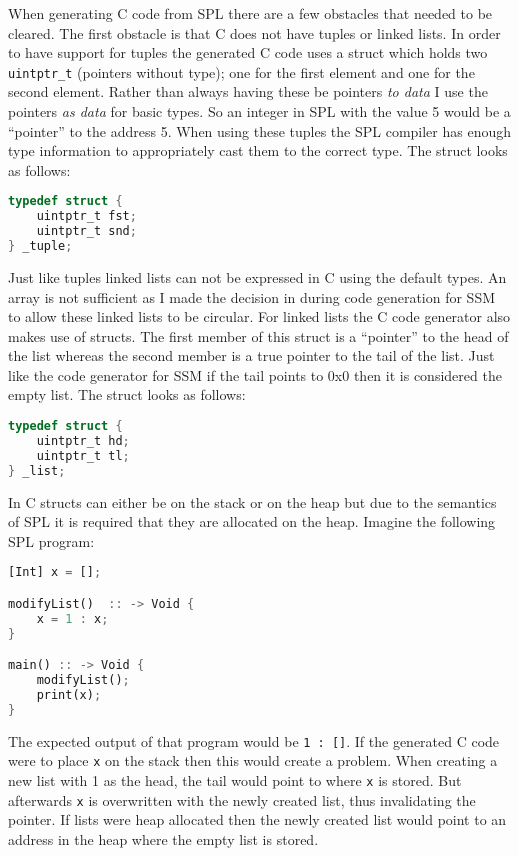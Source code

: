 \documentclass{article}
\begin{document}
When generating C code from SPL there are a few obstacles that needed to be cleared. The first obstacle is that C does not have tuples or linked lists. In order to have support for tuples the generated C code uses a struct which holds two \texttt{uintptr\_t} (pointers without type); one for the first element and one for the second element. Rather than always having these be pointers \textit{to data} I use the pointers \textit{as data} for basic types. So an integer in SPL with the value 5 would be a ``pointer'' to the address 5. When using these tuples the SPL compiler has enough type information to appropriately cast them to the correct type. The struct looks as follows:
\begin{lstlisting}[language=C, style=boxed]
typedef struct {
	uintptr_t fst;
	uintptr_t snd;
} _tuple;
\end{lstlisting}

Just like tuples linked lists can not be expressed in C using the default types. An array is not sufficient as I made the decision in during code generation for SSM to allow these linked lists to be circular. For linked lists the C code generator also makes use of structs. The first member of this struct is a ``pointer'' to the head of the list whereas the second member is a true pointer to the tail of the list. Just like the code generator for SSM if the tail points to 0x0 then it is considered the empty list. The struct looks as follows:
\begin{lstlisting}[language=C, style=boxed]
typedef struct {
	uintptr_t hd;
	uintptr_t tl;
} _list;
\end{lstlisting}

In C structs can either be on the stack or on the heap but due to the semantics of SPL it is required that they are allocated on the heap. Imagine the following SPL program:
\begin{lstlisting}[language=Rust, style=boxed]
[Int] x = [];

modifyList()  :: -> Void {
	x = 1 : x;
}

main() :: -> Void {
	modifyList();
	print(x);
}
\end{lstlisting}

The expected output of that program would be \texttt{1 : []}. If the generated C code were to place \texttt{x} on the stack then this would create a problem. When creating a new list with 1 as the head, the tail would point to where \texttt{x} is stored. But afterwards \texttt{x} is overwritten with the newly created list, thus invalidating the pointer. If lists were heap allocated then the newly created list would point to an address in the heap where the empty list is stored.
\end{document}
